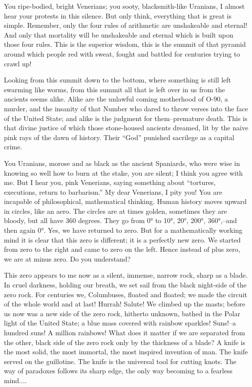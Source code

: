 \documentclass[11pt,openany]{book}
\begin{document}
You ripe-bodied, bright Venerians; you sooty, blacksmith-like Uranians, I almost hear your protests in this silence. But only think, everything that is great is simple. Remember, only the four rules of arithmetic are unshakeable and eternal! And only that mortality will be unshakeable and eternal which is built upon those four rules. This is the superior wisdom, this is the summit of that pyramid around which people red with sweat, fought and battled for centuries trying to crawl up!

Looking from this summit down to the bottom, where something is still left swarming like worms, from this summit all that is left over in us from the ancients seems alike. Alike are the unlawful coming motherhood of O-90, a murder, and the insanity of that Number who dared to throw verses into the face of the United State; and alike is the judgment for them--premature death. This is that divine justice of which those stone-housed ancients dreamed, lit by the naive pink rays of the dawn of history. Their ``God'' punished sacrilege as a capital crime.

You Uranians, morose and as black as the ancient Spaniards, who were wise in knowing so well how to burn at the stake, you are silent; I think you agree with me. But I hear you, pink Venerians, saying something about ``tortures, executions, return to barbarism.'' My dear Venerians, I pity you! You are incapable of philosophical, mathematical thinking. Human history moves upward in circles, like an aero. The circles are at times golden, sometimes they are bloody, but all have 360 degrees. They go from 0° to 10°, 20°, 200°, 360°,--and then again 0°. Yes, we have returned to zero. But for a mathematically working mind it is clear that this zero is different; it is a perfectly new zero. We started from zero to the right and came to zero on the left. Hence instead of plus zero, we are at minus zero. Do you understand?

This zero appears to me now as a silent, immense, narrow rock, sharp as a blade. In cruel darkness, holding our breath, we set sail from the black night-side of the zero rock. For centuries we, Columbuses, floated and floated; we made the circuit of the whole world and at last! Hurrah! Salute! We climbed up the masts; before us now was a new side of the zero rock, hitherto unknown, bathed in the Polar light of the United State; a blue mass covered with rainbow sparkles! Suns!--a hundred suns! A million rainbows! What does it matter if we are separated from the other, black side of the zero rock only by the thickness of a blade? A knife is the most solid, the most immortal, the most inspired invention of man. The knife served on the guillotine. The knife is the universal tool for cutting knots. The way of paradoxes follows its sharp edge, the only way becoming to a fearless mind....
\end{document}
